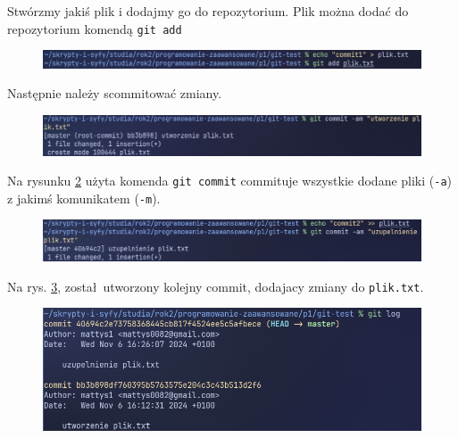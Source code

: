 Stwórzmy jakiś plik i dodajmy go do repozytorium. Plik można dodać do repozytorium komendą \texttt{git add}

\begin{figure}[H]
	\centering
	\includegraphics[width=1\textwidth]{images/git_add.png}
	\caption{}
	\label{fig:git_add}
\end{figure}

Następnie należy scommitować zmiany. 

\begin{figure}[H]
	\centering
	\includegraphics[width=1\textwidth]{images/git_commit1.png}
	\caption{}
	\label{fig:git_commit1}
\end{figure}

Na rysunku \ref{fig:git_commit1} użyta komenda \texttt{git commit} commituje wszystkie dodane pliki (\texttt{-a}) z jakimś komunikatem (\texttt{-m}).  

\begin{figure}[H]
	\centering
	\includegraphics[width=1\textwidth]{images/git_commit2.png}
	\caption{}
	\label{fig:git_commit2}
\end{figure}

Na rys. \ref{fig:git_commit2}, został utworzony kolejny commit, dodajacy zmiany do \texttt{plik.txt}.

\begin{figure}[H]
	\centering
	\includegraphics[width=1\textwidth]{images/git_log.png}
	\caption{}
	\label{fig:git_log}
\end{figure}

